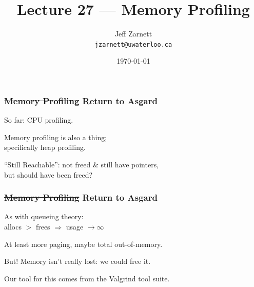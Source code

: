 
\usepackage{soul}

\title{Lecture 27 --- Memory Profiling }

\author{Jeff Zarnett \\ \small \texttt{jzarnett@uwaterloo.ca}}
\date{\today}




\begin{frame}
  \titlepage

 \end{frame}



\begin{frame}
\frametitle{\st{Memory Profiling} Return to Asgard}

\large
\begin{changemargin}{2cm}
So far: CPU profiling. 

Memory profiling is also a thing; \\
\qquad specifically heap profiling.

``Still Reachable'': not freed \& still have pointers, \\
\qquad but should have been freed?
\end{changemargin}

\end{frame}



\begin{frame}
\frametitle{\st{Memory Profiling} Return to Asgard}

\large
\begin{changemargin}{2cm}
As with queueing theory:\\
\qquad allocs $>$ frees $\Longrightarrow$ usage $\rightarrow \infty$

At least more paging, maybe total out-of-memory.

But! Memory isn't really lost: we could free it.

Our tool for this comes from the Valgrind tool suite.
\end{changemargin}

\end{frame}


